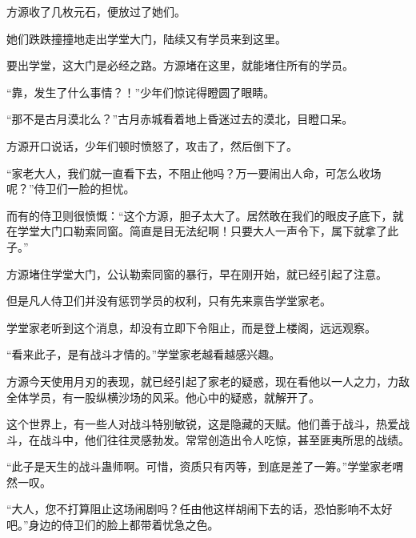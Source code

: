 \begin{this_body}
方源收了几枚元石，便放过了她们。

她们跌跌撞撞地走出学堂大门，陆续又有学员来到这里。

要出学堂，这大门是必经之路。方源堵在这里，就能堵住所有的学员。

“靠，发生了什么事情？！”少年们惊诧得瞪圆了眼睛。

“那不是古月漠北么？”古月赤城看着地上昏迷过去的漠北，目瞪口呆。

方源开口说话，少年们顿时愤怒了，攻击了，然后倒下了。

“家老大人，我们就一直看下去，不阻止他吗？万一要闹出人命，可怎么收场呢？”侍卫们一脸的担忧。

而有的侍卫则很愤慨：“这个方源，胆子太大了。居然敢在我们的眼皮子底下，就在学堂大门口勒索同窗。简直是目无法纪啊！只要大人一声令下，属下就拿了此子。”

方源堵住学堂大门，公认勒索同窗的暴行，早在刚开始，就已经引起了注意。

但是凡人侍卫们并没有惩罚学员的权利，只有先来禀告学堂家老。

学堂家老听到这个消息，却没有立即下令阻止，而是登上楼阁，远远观察。

“看来此子，是有战斗才情的。”学堂家老越看越感兴趣。

方源今天使用月刃的表现，就已经引起了家老的疑惑，现在看他以一人之力，力敌全体学员，有一股纵横沙场的风采。他心中的疑惑，就解开了。

这个世界上，有一些人对战斗特别敏锐，这是隐藏的天赋。他们善于战斗，热爱战斗，在战斗中，他们往往灵感勃发。常常创造出令人吃惊，甚至匪夷所思的战绩。

“此子是天生的战斗蛊师啊。可惜，资质只有丙等，到底是差了一筹。”学堂家老喟然一叹。

“大人，您不打算阻止这场闹剧吗？任由他这样胡闹下去的话，恐怕影响不太好吧。”身边的侍卫们的脸上都带着忧急之色。

\end{this_body}

